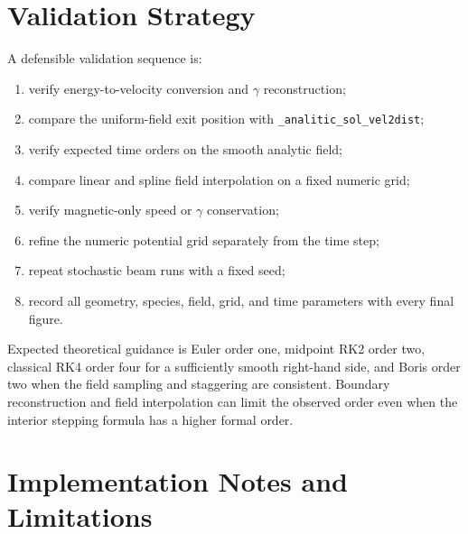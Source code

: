 \documentclass[11pt,a4paper]{report}
\newcommand{\code}[1]{\texttt{#1}}
\begin{document}
\chapter{Validation Strategy}

A defensible validation sequence is:
\begin{enumerate}
  \item verify energy-to-velocity conversion and $\gamma$ reconstruction;
  \item compare the uniform-field exit position with
        \code{\_analitic\_sol\_vel2dist};
  \item verify expected time orders on the smooth analytic field;
  \item compare linear and spline field interpolation on a fixed numeric grid;
  \item verify magnetic-only speed or $\gamma$ conservation;
  \item refine the numeric potential grid separately from the time step;
  \item repeat stochastic beam runs with a fixed seed;
  \item record all geometry, species, field, grid, and time parameters with
        every final figure.
\end{enumerate}

Expected theoretical guidance is Euler order one, midpoint RK2 order two,
classical RK4 order four for a sufficiently smooth right-hand side, and Boris
order two when the field sampling and staggering are consistent.  Boundary
reconstruction and field interpolation can limit the observed order even when
the interior stepping formula has a higher formal order.

\chapter{Implementation Notes and Limitations}
\end{document}
